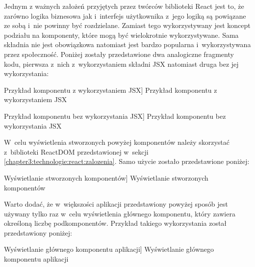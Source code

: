 \documentclass[../Kamil_Kowalewski_Main.tex]{subfiles}
\begin{document}
{{{            Jednym z ważnych założeń przyjętych przez twórców biblioteki React jest to,
            że zarówno logika biznesowa jak i~interfejs użytkownika z~jego logiką są
            powiązane ze sobą i~nie powinny być rozdzielane. Zamiast tego
            wykorzystywany jest koncept podziału na komponenty, które mogą być
            wielokrotnie wykorzystywane. Sama składnia nie jest obowiązkowa natomiast
            jest bardzo popularna i~wykorzystywana przez społeczność. Poniżej zostały
            przedstawione dwa analogiczne fragmenty kodu, pierwsza z~nich
            z~wykorzystaniem składni JSX natomiast druga bez jej wykorzystania:
            \begin{code}[H]
                
                \caption
                [Przykład komponentu z wykorzystaniem JSX]
                {Przykład komponentu z wykorzystaniem JSX}
                \label{chapter3:technologie:react:jsx:with_jsx}
            \end{code}

            \begin{code}[H]
                
                \caption
                [Przykład komponentu bez wykorzystania JSX]
                {Przykład komponentu bez wykorzystania JSX}
                \label{chapter3:technologie:react:jsx:without_jsx}
            \end{code}

            W~celu wyświetlenia stworzonych powyżej komponentów należy skorzystać
            z~biblioteki ReactDOM przedstawionej w~sekcji
            \ref{chapter3:technologie:react:zalozenia}. Samo użycie zostało
            przedstawione poniżej:
            \begin{code}[H]
                
                \caption
                [Wyświetlanie stworzonych komponentów]
                {Wyświetlanie stworzonych komponentów}
                \label{chapter3:technologie:react:jsx:basic_render}
            \end{code}

            Warto dodać, że w~większości aplikacji przedstawiony powyżej sposób
            jest używany tylko raz w~celu wyświetlenia głównego komponentu, który
            zawiera określoną liczbę podkomponentów. Przykład takiego wykorzystania
            został przedstawiony poniżej:
            \begin{code}[H]
                
                \caption
                [Wyświetlanie głównego komponentu aplikacji]
                {Wyświetlanie głównego komponentu aplikacji}
                \label{chapter3:technologie:react:jsx:app_render}
            \end{code}

}}}
\end{document}
